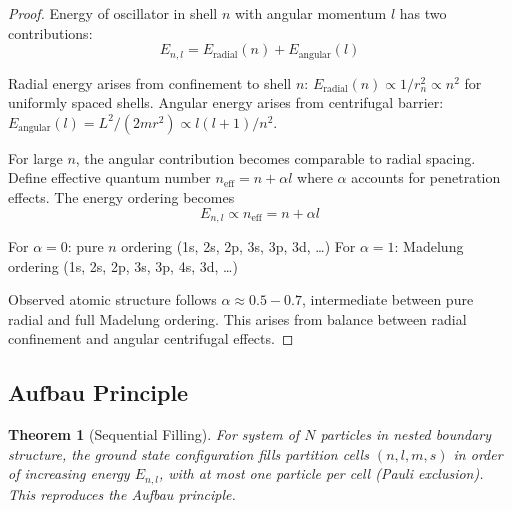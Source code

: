 \documentclass[twocolumn,10pt]{article}
\newtheorem{theorem}{Theorem}[section]
\begin{document}
\begin{proof}
Energy of oscillator in shell $n$ with angular momentum $l$ has two contributions:
\begin{equation}
E_{n,l} = E_{\text{radial}}(n) + E_{\text{angular}}(l)
\end{equation}

Radial energy arises from confinement to shell $n$: $E_{\text{radial}}(n) \propto 1/r_n^2 \propto n^2$ for uniformly spaced shells. Angular energy arises from centrifugal barrier: $E_{\text{angular}}(l) = L^2/(2mr^2) \propto l(l+1)/n^2$.

For large $n$, the angular contribution becomes comparable to radial spacing. Define effective quantum number $n_{\text{eff}} = n + \alpha l$ where $\alpha$ accounts for penetration effects. The energy ordering becomes
\begin{equation}
E_{n,l} \propto n_{\text{eff}} = n + \alpha l
\end{equation}

For $\alpha = 0$: pure $n$ ordering (1s, 2s, 2p, 3s, 3p, 3d, \ldots)
For $\alpha = 1$: Madelung ordering (1s, 2s, 2p, 3s, 3p, 4s, 3d, \ldots)

Observed atomic structure follows $\alpha \approx 0.5-0.7$, intermediate between pure radial and full Madelung ordering. This arises from balance between radial confinement and angular centrifugal effects.
\end{proof}

\subsection{Aufbau Principle}

\begin{theorem}[Sequential Filling]
\label{thm:aufbau}
For system of $N$ particles in nested boundary structure, the ground state configuration fills partition cells $(n,l,m,s)$ in order of increasing energy $E_{n,l}$, with at most one particle per cell (Pauli exclusion). This reproduces the Aufbau principle.
\end{theorem}
\end{document}
